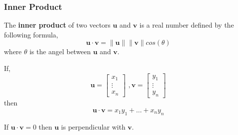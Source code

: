 \documentclass[12pt,aspectratio=169]{beamer}
\begin{document}
\begin{frame}
\frametitle{Inner Product}
The \textbf{inner product} of two vectors $\mathbf{u}$ and $\mathbf{v}$ is a real number defined by the following formula,\pause
\[
\mathbf{u}\cdot \mathbf{v}=\|\mathbf{u}\|\|\mathbf{v}\|cos(\theta)
\]\pause
where $\theta$ is the angel between $\mathbf{u}$ and $\mathbf{v}$.
\begin{figure}
\end{figure}
\end{frame}

\begin{frame}
If,\pause
\[\mathbf{u}=
\begin{bmatrix}
x_1\\
\vdots\\
x_n
\end{bmatrix}\,\, ,
\mathbf{v}=
\begin{bmatrix}
y_1\\
\vdots\\
y_n
\end{bmatrix}
\]\pause
then \pause
\[
\mathbf{u}\cdot \mathbf{v}=x_1y_1+\dots+x_ny_n
\]
\end{frame}

\begin{frame}
If $\mathbf{u}\cdot \mathbf{v}=0$ then $\mathbf{u}$ is perpendicular with $\mathbf{v}$.\pause
\begin{figure}
\end{figure}
\end{frame}
%
\end{document}
